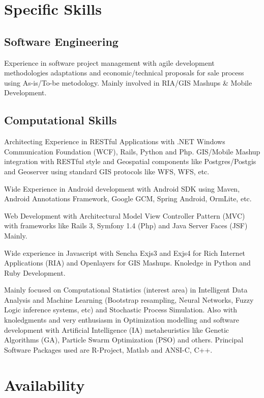 \documentclass[11pt,letterpaper,roman]{moderncv}
\begin{document}
\section{Specific Skills}
\subsection{Software Engineering}
	{Experience in software project management with agile development
methodologies adaptations and economic/technical proposals for sale process
using As-is/To-be metodology. Mainly involved in RIA/GIS Mashups \& Mobile Development.}
	
\subsection{Computational Skills}

	{Architecting Experience in RESTful Applications with .NET Windows
Communication Foundation (WCF), Rails, Python and Php. GIS/Mobile Mashup
integration with RESTful style and Geospatial components like Postgres/Postgis
and Geoserver using standard GIS protocols like WFS, WFS, etc.}

 {Wide Experience in Android development with Android
SDK using Maven, Android Annotations Framework, Google GCM, Spring Android, OrmLite, etc.}

 {Web Development with Architectural Model View
Controller Pattern (MVC) with frameworks like Rails 3, Symfony 1.4 (Php) and
Java Server Faces (JSF) Mainly.}

 {Wide experience in Javascript with Sencha
Exjs3 and Exjs4 for Rich Internet Applications (RIA) and Openlayers for GIS
Mashups. Knoledge in Python and Ruby Development.}

	{Mainly focused on Computational Statistics (interest area) in
	Intelligent Data Analysis and Machine Learning (Bootstrap resampling, Neural
	Networks, Fuzzy Logic inference systems, etc)  and Stochastic Process
	Simulation. Also with knoledgments and very enthusiasm in Optimization modelling
	and software development with Artificial Intelligence (IA) metaheuristics like
	Genetic Algorithms (GA), Particle Swarm Optimization (PSO) and others. Principal
	Software Packages used are R-Project, Matlab and ANSI-C, C++.}

\section{Availability} 
\end{document}
